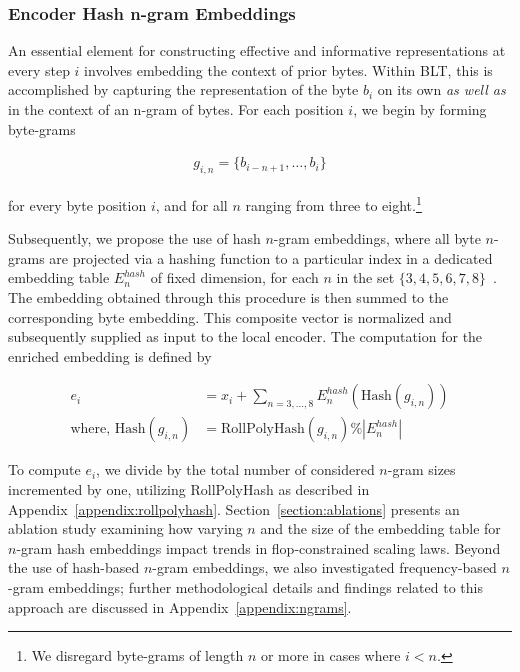 \subsubsection{Encoder Hash n-gram Embeddings}
\label{sec:ngram-emb}
\label{sec:hash-emb}
An essential element for constructing effective and informative representations at every step $i$ involves embedding the context of prior bytes. Within {\textsc BLT}, this is accomplished by capturing the representation of the byte $b_i$ on its own \textit{as well as} in the context of an n-gram of bytes. For each position $i$, we begin by forming byte-grams

\begin{align}
    g_{i,n}=\{b_{i-n + 1},\ldots, b_i\}
\end{align}

for every byte position $i$, and for all $n$ ranging from three to eight.\footnote{
We disregard byte-grams of length $n$ or more in cases where $i<n$. }

Subsequently, we propose the use of hash $n$-gram embeddings, where all byte $n$-grams are projected via a hashing function to a particular index in a dedicated embedding table $E_{n}^{hash}$ of fixed dimension, for each $n$ in the set $\{3,4,5,6,7,8\}$~\citep{bai2010learning}.
The embedding obtained through this procedure is then summed to the corresponding byte embedding. This composite vector is normalized and subsequently supplied as input to the local encoder. The computation for the enriched embedding is defined by

\begin{align}
e_i &= x_i + \sum_{n = 3,...,8}E_{n}^{hash}(\text{Hash}(g_{i,n})) \\
\text{where, Hash}(g_{i,n}) &= \text{RollPolyHash}(g_{i,n}) \% |E_{n}^{hash}|
\end{align}

To compute $e_i$, we divide by the total number of considered $n$-gram sizes incremented by one, utilizing RollPolyHash as described in Appendix~\ref{appendix:rollpolyhash}. Section~\ref{section:ablations} presents an ablation study examining how varying $n$ and the size of the embedding table for $n$-gram hash embeddings impact trends in flop-constrained scaling laws. Beyond the use of hash-based $n$-gram embeddings, we also investigated frequency-based $n$-gram embeddings; further methodological details and findings related to this approach are discussed in Appendix~\ref{appendix:ngrams}.

